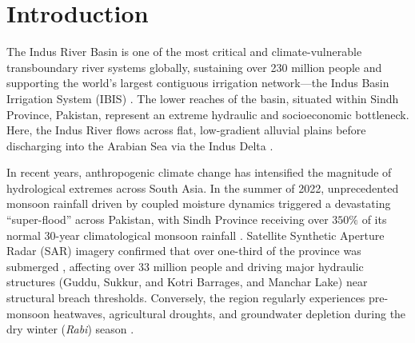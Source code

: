 \documentclass[11pt,a4paper,fleqn]{article}
\begin{document}
\newpage


\section{Introduction}
The Indus River Basin is one of the most critical and climate-vulnerable transboundary river systems globally, sustaining over 230 million people and supporting the world's largest contiguous irrigation network---the Indus Basin Irrigation System (IBIS) \citep{immerzeel2020importance, young2019pakistan}. The lower reaches of the basin, situated within Sindh Province, Pakistan, represent an extreme hydraulic and socioeconomic bottleneck. Here, the Indus River flows across flat, low-gradient alluvial plains before discharging into the Arabian Sea via the Indus Delta \citep{hashmi2022hydrodynamic, inam2007geographic}.

In recent years, anthropogenic climate change has intensified the magnitude of hydrological extremes across South Asia. In the summer of 2022, unprecedented monsoon rainfall driven by coupled moisture dynamics triggered a devastating ``super-flood'' across Pakistan, with Sindh Province receiving over $350\%$ of its normal 30-year climatological monsoon rainfall \citep{nanditha20232022, syed2022analysis, wwa2022pakistan}. Satellite Synthetic Aperture Radar (SAR) imagery confirmed that over one-third of the province was submerged \citep{tian2023satellite}, affecting over 33 million people and driving major hydraulic structures (Guddu, Sukkur, and Kotri Barrages, and Manchar Lake) near structural breach thresholds. Conversely, the region regularly experiences pre-monsoon heatwaves, agricultural droughts, and groundwater depletion during the dry winter (\textit{Rabi}) season \citep{biemans2016future, rodell2018emerging}.
\end{document}
